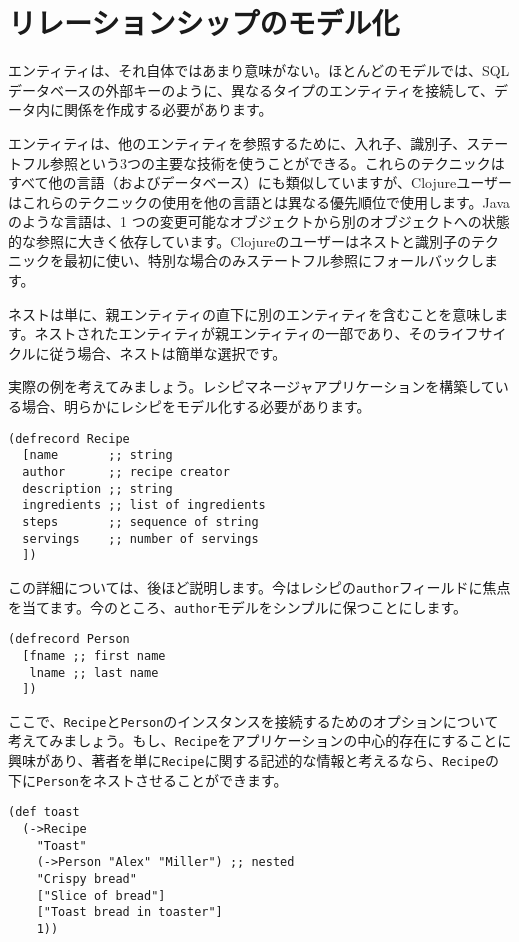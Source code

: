 \section{リレーションシップのモデル化}

エンティティは、それ自体ではあまり意味がない。ほとんどのモデルでは、SQLデータベースの外部キーのように、異なるタイプのエンティティを接続して、データ内に関係を作成する必要があります。

エンティティは、他のエンティティを参照するために、入れ子、識別子、ステートフル参照という3つの主要な技術を使うことができる。これらのテクニックはすべて他の言語（およびデータベース）にも類似していますが、Clojureユーザーはこれらのテクニックの使用を他の言語とは異なる優先順位で使用します。Java のような言語は、1 つの変更可能なオブジェクトから別のオブジェクトへの状態的な参照に大きく依存しています。Clojureのユーザーはネストと識別子のテクニックを最初に使い、特別な場合のみステートフル参照にフォールバックします。

ネストは単に、親エンティティの直下に別のエンティティを含むことを意味します。ネストされたエンティティが親エンティティの一部であり、そのライフサイクルに従う場合、ネストは簡単な選択です。

実際の例を考えてみましょう。レシピマネージャアプリケーションを構築している場合、明らかにレシピをモデル化する必要があります。


\begin{lstlisting}[numbers=none]
(defrecord Recipe
  [name       ;; string
  author      ;; recipe creator
  description ;; string
  ingredients ;; list of ingredients
  steps       ;; sequence of string
  servings    ;; number of servings
  ])
\end{lstlisting}


この詳細については、後ほど説明します。今はレシピの\texttt{author}フィールドに焦点を当てます。今のところ、\texttt{author}モデルをシンプルに保つことにします。


\begin{lstlisting}[numbers=none]
(defrecord Person
  [fname ;; first name
   lname ;; last name
  ])
\end{lstlisting}

ここで、\texttt{Recipe}と\texttt{Person}のインスタンスを接続するためのオプションについて考えてみましょう。もし、\texttt{Recipe}をアプリケーションの中心的存在にすることに興味があり、著者を単に\texttt{Recipe}に関する記述的な情報と考えるなら、\texttt{Recipe}の下に\texttt{Person}をネストさせることができます。

\begin{lstlisting}[numbers=none]
(def toast
  (->Recipe
    "Toast"
    (->Person "Alex" "Miller") ;; nested
    "Crispy bread"
    ["Slice of bread"]
    ["Toast bread in toaster"]
    1))
\end{lstlisting}

